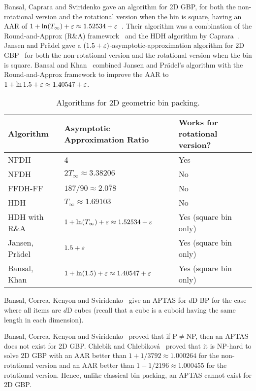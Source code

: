 Bansal, Caprara and Sviridenko gave an algorithm for 2D GBP,
for both the non-rotational version and the rotational version when the bin is square,
having an AAR of $1 + \ln(T_{\infty}) + \varepsilon \approx 1.52534 + \varepsilon$~\cite{rna}.
Their algorithm was a combination of the Round-and-Approx (R\&A) framework~\cite{rna}
and the HDH algorithm by Caprara~\cite{caprara2008}.
Jansen and Pr\"adel gave a $(1.5 + \varepsilon)$-asymptotic-approximation
algorithm for 2D GBP~\cite{JansenP2013}
for both the non-rotational version and the rotational version when the bin is square.
Bansal and Khan~\cite{bansal2014binpacking} combined Jansen and Pr\"adel's algorithm
with the Round-and-Approx framework to improve the AAR to
$1 + \ln 1.5 + \varepsilon \approx 1.40547 + \varepsilon$.

\begin{table}[ht]
\centering
\caption{Algorithms for 2D geometric bin packing.}
\begin{tabular}{lll}
\toprule Algorithm & Asymptotic Approximation Ratio & Works for rotational version?
\\ \midrule NFDH~\cite{coffman1980performance}
    & 4 & Yes
\\[\defaultaddspace] NFDH~\cite{coffman1980performance,caprara2008,baker1981tight}
    & $2T_{\infty} \approx 3.38206$ & No
\\[\defaultaddspace] FFDH-FF~\cite{coffman1980performance,caprara2008}
    & $187/90 \approx 2.0\overline{7}8$ & No
\\[\defaultaddspace] HDH~\cite{caprara2008}
    & $T_\infty \approx 1.69103$ & No
\\[\defaultaddspace] HDH with R\&A~\cite{rna}
    & $1 + \ln(T_\infty) + \varepsilon \approx 1.52534 + \varepsilon$
    & Yes (square bin only)
\\[\defaultaddspace] Jansen, Pr\"adel~\cite{JansenP2013}
    & $1.5 + \varepsilon$
    & Yes (square bin only)
\\[\defaultaddspace] Bansal, Khan~\cite{bansal2014binpacking}
    & $1 + \ln(1.5) + \varepsilon \approx 1.40547 + \varepsilon$
    & Yes (square bin only)
\\ \bottomrule
\end{tabular}
\label{table:2gbp}
\end{table}

Bansal, Correa, Kenyon and Sviridenko~\cite{bansal2006bin}
give an APTAS for $d$D BP for the case where all items are $d$D cubes
(recall that a cube is a cuboid having the same length in each dimension).

Bansal, Correa, Kenyon and Sviridenko~\cite{bansal2006bin}
proved that if P$\neq$NP, then an APTAS does not exist for 2D GBP.
Chleb{\'\i}k and Chleb{\'\i}kov\'a~\cite{chlebik2009hardness} proved that it is NP-hard to solve
2D GBP with an AAR better than $1+1/3792 \approx 1.000264$ for the non-rotational version
and an AAR better than $1+1/2196 \approx 1.000455$ for the rotational version.
Hence, unlike classical bin packing, an APTAS cannot exist for 2D GBP.

